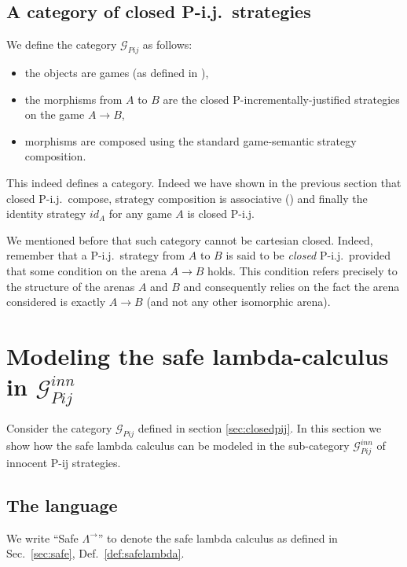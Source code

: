 \subsection{A category of closed P-i.j.\ strategies}

We define the category $\mathcal{G}_{Pij}$ as follows:
\begin{itemize}
\item the objects are games (as defined in \cite{abramsky:game-semantics-tutorial}),
\item the morphisms from $A$ to $B$ are the closed P-incrementally-justified strategies
on the game $A\rightarrow B$,
\item morphisms are composed using the standard game-semantic strategy composition.
\end{itemize}
This indeed defines a category. Indeed we have shown in the previous
section that closed P-i.j.\ compose, strategy composition is
associative (\cite{abramsky94full,hylandong_pcf}) and finally the
identity strategy $id_A$ for any game $A$ is closed P-i.j.

We mentioned before that such category cannot be cartesian closed. Indeed, remember that
a P-i.j.\ strategy from $A$ to $B$ is said to be \emph{closed} P-i.j.\ provided that some condition
on the arena $A\rightarrow B$ holds. This condition refers precisely to the structure of the arenas $A$ and $B$ and consequently relies on the fact the arena considered is exactly $A\rightarrow B$ (and not any other isomorphic arena).



\section{\texorpdfstring{Modeling the safe lambda-calculus in $\mathcal{G}_{Pij}^{inn}$}
{Categorical model of the safe lambda calculus}}

Consider the category $\mathcal{G}_{Pij}$ defined in section
\ref{sec:closedpij}. In this section we show how the safe lambda
calculus can be modeled in the sub-category
$\mathcal{G}_{Pij}^{inn}$ of innocent P-ij strategies.

\subsection{The language}

We write ``Safe $\Lambda^{\rightarrow}$'' to denote the safe lambda
calculus as defined in Sec.\ \ref{sec:safe}, Def.\
\ref{def:safelambda}.


